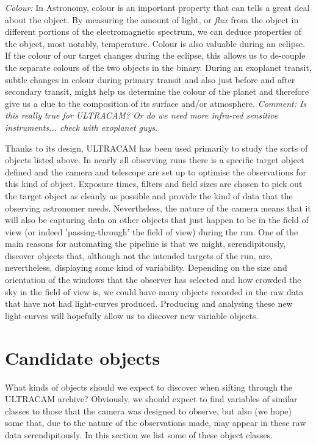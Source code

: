 \emph{Colour:} In Astronomy, colour is an important property that can tells a great deal about the object. By measuring the amount of light, or \emph{flux} from the object in different portions of the electromagnetic spectrum, we can deduce properties of the object, most notably, temperature. Colour is also valuable during an eclipse. If the colour of our target changes during the eclipse, this allows us to de-couple the separate colours of the two objects in the binary. During an exoplanet transit, subtle changes in colour during primary transit and also just before and after secondary transit, might help us determine the colour of the planet and therefore give us a clue to the composition of its surface and/or atmosphere. \emph{Comment: Is this really true for ULTRACAM? Or do we need more infra-red sensitive instruments... check with exoplanet guys}. 

Thanks to its design, ULTRACAM has been used primarily to study the sorts of objects listed above. In nearly all observing runs there is a specific target object defined and the camera and telescope are set up to optimise the observations for this kind of object. Exposure times, filters and field sizes are chosen to pick out the target object as cleanly as possible and provide the kind of data that the observing astronomer needs. Nevertheless, the nature of the camera means that it will also be capturing data on other objects that just happen to be in the field of view (or indeed 'passing-through' the field of view) during the run. One of the main reasons for automating the pipeline is that we might, serendipitously, discover objects that, although not the intended targets of the run, are, nevertheless, displaying some kind of variability. Depending on the size and orientation of the windows that the observer has selected and how crowded the sky in the field of view is, we could have many objects recorded in the raw data that have not had light-curves produced. Producing and analysing these new light-curves will hopefully allow us to discover new variable objects. 

\section{Candidate objects}
What kinds of objects should we expect to discover when sifting through the ULTRACAM archive? Obviously, we should expect to find variables of similar classes to those that the camera was designed to observe, but also (we hope) some that, due to the nature of the observations made, may appear in these raw data serendipitously.  In this section we list some of these object classes. 


